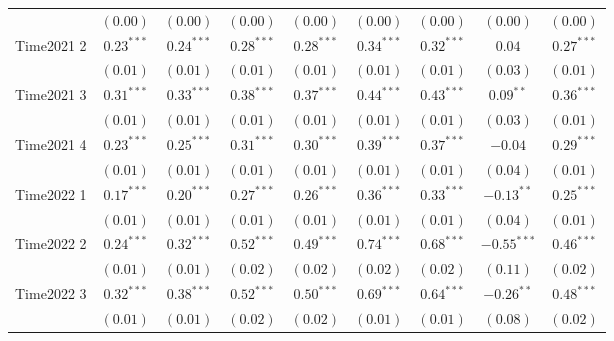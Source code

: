 \begin{table}
\begin{center}
\begin{tabular}{l c c c c c c c c}
                             & $(0.00)$      & $(0.00)$      & $(0.00)$      & $(0.00)$      & $(0.00)$      & $(0.00)$      & $(0.00)$      & $(0.00)$      \\
Time2021 2                   & $0.23^{***}$  & $0.24^{***}$  & $0.28^{***}$  & $0.28^{***}$  & $0.34^{***}$  & $0.32^{***}$  & $0.04$        & $0.27^{***}$  \\
                             & $(0.01)$      & $(0.01)$      & $(0.01)$      & $(0.01)$      & $(0.01)$      & $(0.01)$      & $(0.03)$      & $(0.01)$      \\
Time2021 3                   & $0.31^{***}$  & $0.33^{***}$  & $0.38^{***}$  & $0.37^{***}$  & $0.44^{***}$  & $0.43^{***}$  & $0.09^{**}$   & $0.36^{***}$  \\
                             & $(0.01)$      & $(0.01)$      & $(0.01)$      & $(0.01)$      & $(0.01)$      & $(0.01)$      & $(0.03)$      & $(0.01)$      \\
Time2021 4                   & $0.23^{***}$  & $0.25^{***}$  & $0.31^{***}$  & $0.30^{***}$  & $0.39^{***}$  & $0.37^{***}$  & $-0.04$       & $0.29^{***}$  \\
                             & $(0.01)$      & $(0.01)$      & $(0.01)$      & $(0.01)$      & $(0.01)$      & $(0.01)$      & $(0.04)$      & $(0.01)$      \\
Time2022 1                   & $0.17^{***}$  & $0.20^{***}$  & $0.27^{***}$  & $0.26^{***}$  & $0.36^{***}$  & $0.33^{***}$  & $-0.13^{**}$  & $0.25^{***}$  \\
                             & $(0.01)$      & $(0.01)$      & $(0.01)$      & $(0.01)$      & $(0.01)$      & $(0.01)$      & $(0.04)$      & $(0.01)$      \\
Time2022 2                   & $0.24^{***}$  & $0.32^{***}$  & $0.52^{***}$  & $0.49^{***}$  & $0.74^{***}$  & $0.68^{***}$  & $-0.55^{***}$ & $0.46^{***}$  \\
                             & $(0.01)$      & $(0.01)$      & $(0.02)$      & $(0.02)$      & $(0.02)$      & $(0.02)$      & $(0.11)$      & $(0.02)$      \\
Time2022 3                   & $0.32^{***}$  & $0.38^{***}$  & $0.52^{***}$  & $0.50^{***}$  & $0.69^{***}$  & $0.64^{***}$  & $-0.26^{**}$  & $0.48^{***}$  \\
                             & $(0.01)$      & $(0.01)$      & $(0.02)$      & $(0.02)$      & $(0.01)$      & $(0.01)$      & $(0.08)$      & $(0.02)$      \\

\end{tabular}
\end{center}
\end{table}
